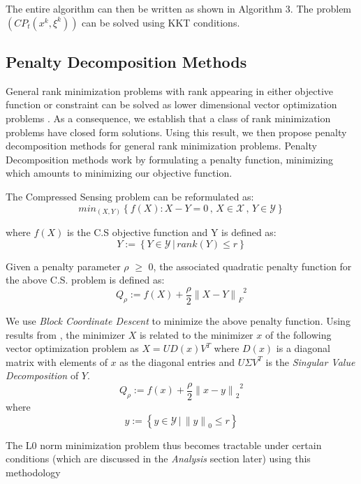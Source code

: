 \documentclass[letterpaper, 10 pt, conference]{article}
\begin{document}
The entire algorithm can then be written as shown in Algorithm 3.
The problem $(CP_t(x^k, \xi^k))$ can be solved using KKT conditions.

\subsection{Penalty Decomposition Methods}
General rank minimization problems with rank appearing
in either objective function or constraint can be solved as lower dimensional vector optimization problems \cite{pd}. As a consequence, we establish that a class of rank minimization problems have closed form solutions. Using this result, we then propose penalty decomposition methods for general rank minimization problems. Penalty Decomposition methods work by formulating a penalty function, minimizing which amounts to minimizing our objective function.

The Compressed Sensing problem can be reformulated as:
$$min_{(X,Y)}\left\{{f(X) : X-Y=0\,,\, X \in \mathcal{X}\,,\, Y \in \mathcal{Y}}\right\}$$

where $f(X)$ is the C.S objective function and Y is defined as:
$$Y:=\left\{{Y \in \mathcal{Y}\,  |\,  rank(Y) \le r}\right\}$$

Given a penalty parameter $\rho$ $\ge$ 0, the associated quadratic penalty function for the above C.S. problem is defined as:
$$Q_{\rho} := {f(X)+\frac{\rho}{2} {{\|X-Y \|}_F}^2}$$

We use \emph{Block Coordinate Descent} to minimize the above penalty function. Using results from \cite{pd}, the minimizer $X$ is related to the minimizer $x$ of the following vector optimization problem as $X=UD(x){V}^T$ where $D(x)$ is a diagonal matrix with elements of $x$ as the diagonal entries and $U\Sigma V^T$ is the \emph{Singular Value Decomposition} of $Y$.
$$Q_{\rho} := {f(x)+\frac{\rho}{2} {{\|x-y \|}_2}^2}$$
where $$y:=\left\{{y \in \mathcal{Y}\, |\, {\|y\|}_0 \le r}\right\}$$
 
The L0 norm minimization problem thus becomes tractable under certain conditions (which are discussed in the \emph{Analysis} section later) using this methodology

\newpage
\end{document}
